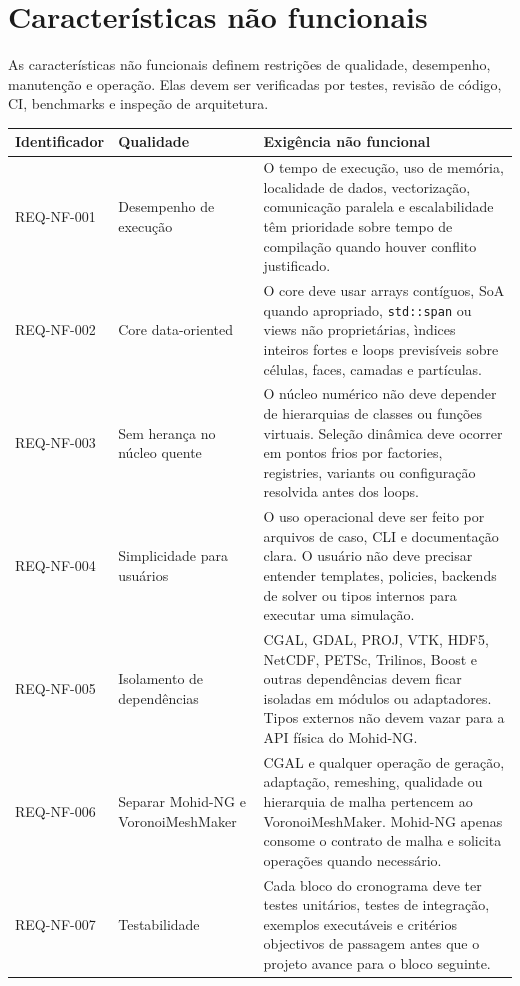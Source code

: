 \documentclass[11pt,a4paper]{article}
\begin{document}
\section{Caracter\'isticas n\~ao funcionais}

As caracter\'isticas n\~ao funcionais definem restri\c{c}\~oes de qualidade, desempenho, manuten\c{c}\~ao e opera\c{c}\~ao. Elas devem ser verificadas por testes, revis\~ao de c\'odigo, CI, benchmarks e inspe\c{c}\~ao de arquitetura.

\begin{longtable}{p{}p{}p{}}
\toprule
\textbf{Identificador} & \textbf{Qualidade} & \textbf{Exig\^encia n\~ao funcional}\tabularnewline
\midrule
REQ-NF-001 & Desempenho de execu\c{c}\~ao & O tempo de execu\c{c}\~ao, uso de mem\'oria, localidade de dados, vectoriza\c{c}\~ao, comunica\c{c}\~ao paralela e escalabilidade t\^em prioridade sobre tempo de compila\c{c}\~ao quando houver conflito justificado.\tabularnewline
\addlinespace
REQ-NF-002 & Core data-oriented & O core deve usar arrays cont\'iguos, SoA quando apropriado, \texttt{std::span} ou views n\~ao propriet\'arias, \`indices inteiros fortes e loops previs\'iveis sobre c\'elulas, faces, camadas e part\'iculas.\tabularnewline
\addlinespace
REQ-NF-003 & Sem heran\c{c}a no n\'ucleo quente & O n\'ucleo num\'erico n\~ao deve depender de hierarquias de classes ou fun\c{c}\~oes virtuais. Sele\c{c}\~ao din\^amica deve ocorrer em pontos frios por factories, registries, variants ou configura\c{c}\~ao resolvida antes dos loops.\tabularnewline
\addlinespace
REQ-NF-004 & Simplicidade para usu\'arios & O uso operacional deve ser feito por arquivos de caso, CLI e documenta\c{c}\~ao clara. O usu\'ario n\~ao deve precisar entender templates, policies, backends de solver ou tipos internos para executar uma simula\c{c}\~ao.\tabularnewline
\addlinespace
REQ-NF-005 & Isolamento de depend\^encias & CGAL, GDAL, PROJ, VTK, HDF5, NetCDF, PETSc, Trilinos, Boost e outras depend\^encias devem ficar isoladas em m\'odulos ou adaptadores. Tipos externos n\~ao devem vazar para a API f\'isica do Mohid-NG.\tabularnewline
\addlinespace
REQ-NF-006 & Separar Mohid-NG e VoronoiMeshMaker & CGAL e qualquer opera\c{c}\~ao de gera\c{c}\~ao, adapta\c{c}\~ao, remeshing, qualidade ou hierarquia de malha pertencem ao VoronoiMeshMaker. Mohid-NG apenas consome o contrato de malha e solicita opera\c{c}\~oes quando necess\'ario.\tabularnewline
\addlinespace
REQ-NF-007 & Testabilidade & Cada bloco do cronograma deve ter testes unit\'arios, testes de integra\c{c}\~ao, exemplos execut\'aveis e crit\'erios objectivos de passagem antes que o projeto avance para o bloco seguinte.\tabularnewline

\end{longtable}
\end{document}
